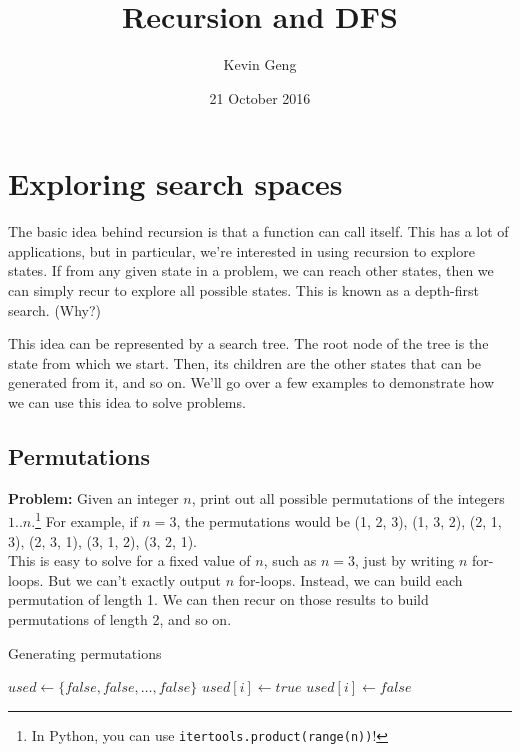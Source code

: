 \documentclass{article}
\title{Recursion and DFS}
\author{Kevin Geng}
\date{21 October 2016}
\begin{document}
\maketitle

\section{Exploring search spaces}
The basic idea behind recursion is that a function can call itself. This has a lot of applications, but in particular, we're interested in using recursion to explore states. If from any given state in a problem, we can reach other states, then we can simply recur to explore all possible states. This is known as a depth-first search. (Why?)

This idea can be represented by a search tree. The root node of the tree is the state from which we start. Then, its children are the other states that can be generated from it, and so on. We'll go over a few examples to demonstrate how we can use this idea to solve problems.


\subsection{Permutations}

\textbf{Problem:} Given an integer $n$, print out all possible permutations of the integers $1..n$.\footnote{In Python, you can use \texttt{itertools.product(range(n))}!} For example, if $n=3$, the permutations would be (1, 2, 3), (1, 3, 2), (2, 1, 3), (2, 3, 1), (3, 1, 2), (3, 2, 1).\\

\noindent This is easy to solve for a fixed value of $n$, such as $n=3$, just by writing $n$ for-loops. But we can't exactly output $n$ for-loops. Instead, we can build each permutation of length 1. We can then recur on those results to build permutations of length 2, and so on.

\begin{algorithm}[H]
\caption{Generating permutations}
\begin{algorithmic}

\State $used \gets \{false, false, \ldots, false\}$
        \State {}
        \State \Return
    \EndIf
            \State $used[i] \gets true$
            \State {}
            \State $used[i] \gets false$
        \EndIf
    \EndFor
\EndFunction

\end{algorithmic}
\end{algorithm}
\end{document}
